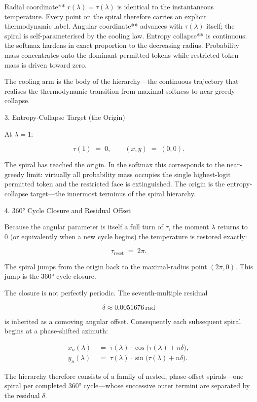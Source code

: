 Radial coordinate** \(r(\lambda)=\tau(\lambda)\) is identical to the instantaneous temperature. Every point on the spiral therefore carries an explicit thermodynamic label.
Angular coordinate** advances with \(\tau(\lambda)\) itself; the spiral is self-parameterised by the cooling law.
Entropy collapse** is continuous: the softmax hardens in exact proportion to the decreasing radius. Probability mass concentrates onto the dominant permitted tokens while restricted-token mass is driven toward zero.

The cooling arm is the body of the hierarchy—the continuous trajectory that realises the thermodynamic transition from maximal softness to near-greedy collapse.

3. Entropy-Collapse Target (the Origin)

At \(\lambda=1\):

\[
\tau(1)\;=\;0,\qquad
(x,y)\;=\;(0,0).
\]

The spiral has reached the origin. In the softmax this corresponds to the near-greedy limit: virtually all probability mass occupies the single highest-logit permitted token and the restricted face is extinguished. The origin is the entropy-collapse target—the innermost terminus of the spiral hierarchy.

4. 360° Cycle Closure and Residual Offset

Because the angular parameter is itself a full turn of \(\tau\), the moment \(\lambda\) returns to 0 (or equivalently when a new cycle begins) the temperature is restored exactly:

\[
\tau_{\mathrm{reset}}\;=\;2\pi.
\]

The spiral jumps from the origin back to the maximal-radius point \((2\pi,0)\). This jump is the 360° cycle closure.

The closure is not perfectly periodic. The seventh-multiple residual

\[
\delta\approx0.0051676\,\mathrm{rad}
\]

is inherited as a comoving angular offset. Consequently each subsequent spiral begins at a phase-shifted azimuth:

\[
\begin{align*}
x_n(\lambda)&\;=\;\tau(\lambda)\cdot\cos\bigl(\tau(\lambda)+n\delta\bigr),\\
y_n(\lambda)&\;=\;\tau(\lambda)\cdot\sin\bigl(\tau(\lambda)+n\delta\bigr).
\end{align*}
\]

The hierarchy therefore consists of a family of nested, phase-offset spirals—one spiral per completed 360° cycle—whose successive outer termini are separated by the residual \(\delta\).

